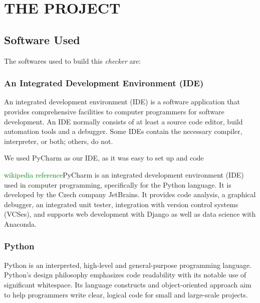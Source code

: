 \documentclass[a4paper]{article}
\begin{document}
\section{THE PROJECT}
\subsection{Software Used}
The softwares used to build this \textit{checker} are:

\subsubsection{An Integrated Development Environment (IDE)}
An integrated development environment (IDE) is a software application that
provides comprehensive facilities to computer programmers for software
development. An IDE normally consists of at least a source code editor, build
automation tools and a debugger. Some IDEs contain the necessary compiler,
interpreter, or both; others, do not.

We used PyCharm as our IDE, as it was easy to set up and code

\textcolor{green}{wikipedia reference}PyCharm is an integrated development environment (IDE) used in computer programming, specifically for the Python language. It is developed by the Czech company JetBrains. It provides code analysis, a graphical debugger, an integrated unit tester, integration with version control systems (VCSes), and supports web development with Django as well as data science with Anaconda.

\subsubsection{Python}
Python is an interpreted, high-level and general-purpose programming language.
Python's design philosophy emphasizes code readability with its notable use of
significant whitespace. Its language constructs and object-oriented approach aim
to help programmers write clear, logical code for small and large-scale projects.
\end{document}
